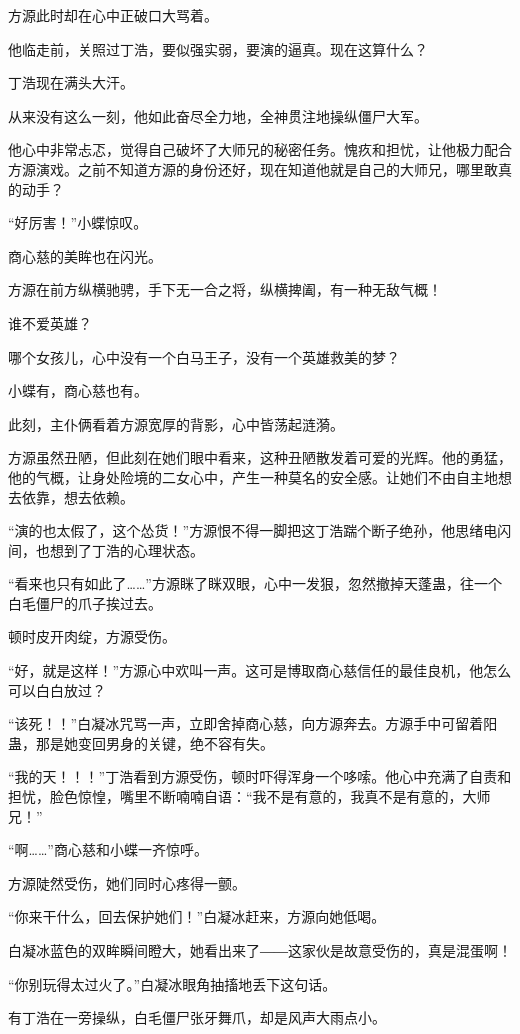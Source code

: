 \begin{this_body}
方源此时却在心中正破口大骂着。

他临走前，关照过丁浩，要似强实弱，要演的逼真。现在这算什么？

丁浩现在满头大汗。

从来没有这么一刻，他如此奋尽全力地，全神贯注地操纵僵尸大军。

他心中非常忐忑，觉得自己破坏了大师兄的秘密任务。愧疚和担忧，让他极力配合方源演戏。之前不知道方源的身份还好，现在知道他就是自己的大师兄，哪里敢真的动手？

“好厉害！”小蝶惊叹。

商心慈的美眸也在闪光。

方源在前方纵横驰骋，手下无一合之将，纵横捭阖，有一种无敌气概！

谁不爱英雄？

哪个女孩儿，心中没有一个白马王子，没有一个英雄救美的梦？

小蝶有，商心慈也有。

此刻，主仆俩看着方源宽厚的背影，心中皆荡起涟漪。

方源虽然丑陋，但此刻在她们眼中看来，这种丑陋散发着可爱的光辉。他的勇猛，他的气概，让身处险境的二女心中，产生一种莫名的安全感。让她们不由自主地想去依靠，想去依赖。

“演的也太假了，这个怂货！”方源恨不得一脚把这丁浩踹个断子绝孙，他思绪电闪间，也想到了丁浩的心理状态。

“看来也只有如此了……”方源眯了眯双眼，心中一发狠，忽然撤掉天蓬蛊，往一个白毛僵尸的爪子挨过去。

顿时皮开肉绽，方源受伤。

“好，就是这样！”方源心中欢叫一声。这可是博取商心慈信任的最佳良机，他怎么可以白白放过？

“该死！！”白凝冰咒骂一声，立即舍掉商心慈，向方源奔去。方源手中可留着阳蛊，那是她变回男身的关键，绝不容有失。

“我的天！！！”丁浩看到方源受伤，顿时吓得浑身一个哆嗦。他心中充满了自责和担忧，脸色惊惶，嘴里不断喃喃自语：“我不是有意的，我真不是有意的，大师兄！”

“啊……”商心慈和小蝶一齐惊呼。

方源陡然受伤，她们同时心疼得一颤。

“你来干什么，回去保护她们！”白凝冰赶来，方源向她低喝。

白凝冰蓝色的双眸瞬间瞪大，她看出来了――这家伙是故意受伤的，真是混蛋啊！

“你别玩得太过火了。”白凝冰眼角抽搐地丢下这句话。

有丁浩在一旁操纵，白毛僵尸张牙舞爪，却是风声大雨点小。


\end{this_body}
